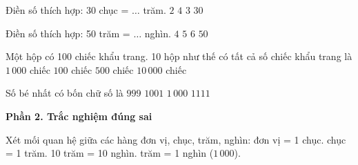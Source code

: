 \begin{ex} %
Điền số thích hợp: 30 chục = $\dots$ trăm.
\choice
{$2$}
{$4$}
{\True $3$}
{$30$}
\end{ex}

\begin{ex} %
Điền số thích hợp: 50 trăm = $\dots$ nghìn.
\choice
{$4$}
{\True $5$}
{$6$}
{$50$}
\end{ex}

\begin{ex} %
Một hộp có 100 chiếc khẩu trang. 10 hộp như thế có tất cả số chiếc khẩu trang là
\choice
{\True $1\,000$ chiếc}
{$100$ chiếc}
{$500$ chiếc}
{$10\,000$ chiếc}
\end{ex}

\begin{ex} %
Số bé nhất có bốn chữ số là
\choice
{$999$}
{$1001$}
{\True $1\,000$}
{$1111$}
\end{ex}

\textbf{Phần 2. Trắc nghiệm đúng sai}

\begin{ex} %
Xét mối quan hệ giữa các hàng đơn vị, chục, trăm, nghìn:
\choiceTF
{ đơn vị = 1 chục.}
{ chục = 1 trăm.}
{10 trăm = 10 nghìn.}
{ trăm = 1 nghìn ($1\,000$).}
\end{ex}

